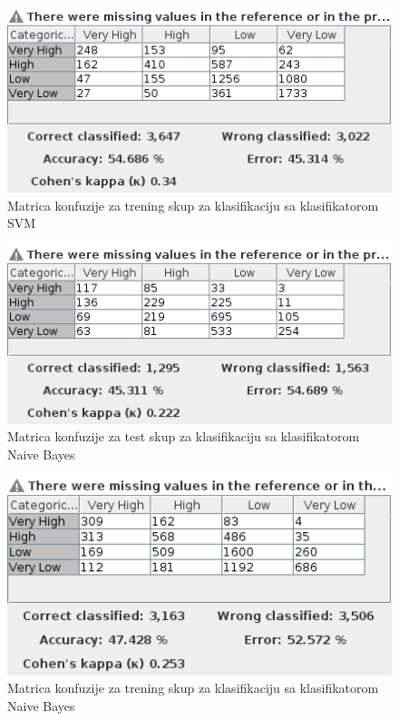 \documentclass[11pt]{article} %
\begin{document}
\begin{figure}[h!]
	\centering
	\includegraphics[width=1.1\textwidth]{priceClassificationTraining/SVM}
	\caption{Matrica konfuzije za trening skup za klasifikaciju sa klasifikatorom SVM}
\end{figure}
\newline
\begin{figure}[h!]
	\centering
	\includegraphics[width=1.1\textwidth]{priceClassificationTest/NaiveBayes}
	\caption{Matrica konfuzije za test skup za klasifikaciju sa klasifikatorom Naive Bayes}
\end{figure}
\begin{figure}[h!]
	\centering
	\includegraphics[width=1.1\textwidth]{priceClassificationTraining/NaiveBayes}
	\caption{Matrica konfuzije za trening skup za klasifikaciju sa klasifikatorom Naive Bayes}
\end{figure}
\end{document}
